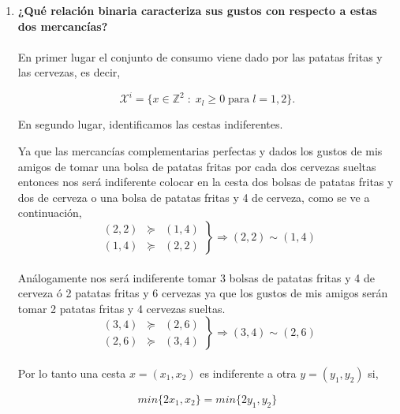 \begin{enumerate}

    \item \textbf{¿Qué relación binaria caracteriza sus gustos con respecto a estas dos mercancías?}\\\\
	En primer lugar el conjunto de consumo viene dado por las patatas fritas y las cervezas, es decir, 

	\begin{tcolorbox}[colframe=white]
	$$\mathcal{X}^i = \lbrace x \in \mathbb{Z}^2 \; : \; x_l \geq 0 \; \mbox{para} \; l=1,2\rbrace.$$
	\end{tcolorbox}

	En segundo lugar, identificamos las cestas indiferentes.  

	Ya que las mercancías complementarias perfectas y dados los gustos de mis amigos de tomar una bolsa de patatas fritas por cada dos cervezas sueltas entonces nos será indiferente colocar en la cesta dos bolsas de patatas fritas y dos de cerveza o  una bolsa de patatas fritas y 4 de cerveza, como se ve a continuación,\\
    $$\left.\begin{array}{rcl} (2,2)&\succeq&(1,4) \\ (1,4) & \succeq&(2,2) \end{array}\right\}\Longrightarrow (2,2) \sim (1,4)$$\\
	Análogamente nos será indiferente tomar 3 bolsas de patatas fritas y 4 de cerveza ó 2 patatas fritas y 6 cervezas ya que los gustos de mis amigos serán tomar 2 patatas fritas y 4 cervezas sueltas.\\
	$$\left.\begin{array}{rcl} (3,4)&\succeq&(2,6) \\ (2,6) & \succeq&(3,4) \end{array}\right\}\Longrightarrow (3,4) \sim (2,6)$$\\
	Por lo tanto una cesta $x=(x_1,x_2)$ es indiferente a otra $y=(y_1,y_2)$ si, \\
	\begin{tcolorbox}[colframe=white]
	$$min\lbrace 2x_1,x_2\rbrace = min\lbrace 2y_1,y_2\rbrace$$
	\end{tcolorbox}


\end{enumerate}
